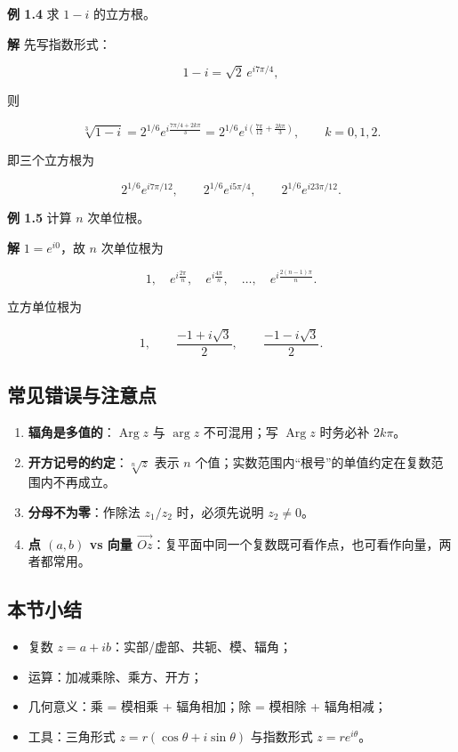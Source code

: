 \textbf{例 1.4} 求 \(1-i\) 的立方根。

\textbf{解} 先写指数形式：

\[
1-i = \sqrt2\,e^{i7\pi/4},
\]

则

\[
\sqrt[3]{1-i}
= 2^{1/6}e^{i\frac{7\pi/4+2k\pi}{3}}
= 2^{1/6}e^{i\left(\frac{7\pi}{12}+\frac{2k\pi}{3}\right)},
\qquad k=0,1,2 .
\]

即三个立方根为

\[
2^{1/6}e^{i7\pi/12},\qquad
2^{1/6}e^{i5\pi/4},\qquad
2^{1/6}e^{i23\pi/12}.
\]

\textbf{例 1.5} 计算 \(n\) 次单位根。

\textbf{解} \(1=e^{i0}\)，故 \(n\) 次单位根为

\[
1,\quad e^{i\frac{2\pi}{n}},\quad e^{i\frac{4\pi}{n}},\quad \ldots,\quad
e^{i\frac{2(n-1)\pi}{n}} .
\]

立方单位根为

\[
1,\qquad \frac{-1+i\sqrt3}{2},\qquad \frac{-1-i\sqrt3}{2}.
\]

\subsection{常见错误与注意点}\label{ux5e38ux89c1ux9519ux8befux4e0eux6ce8ux610fux70b9}

\begin{enumerate}
\def\labelenumi{\arabic{enumi}.}
\tightlist
\item
  \textbf{辐角是多值的}：\(\operatorname{Arg}z\) 与 \(\arg z\)
  不可混用；写 \(\operatorname{Arg}z\) 时务必补 \(2k\pi\)。
\item
  \textbf{开方记号的约定}：\(\sqrt[n]{z}\) 表示 \(n\)
  个值；实数范围内``根号''的单值约定在复数范围内不再成立。
\item
  \textbf{分母不为零}：作除法 \(z_1/z_2\) 时，必须先说明 \(z_2\neq 0\)。
\item
  \textbf{点 \((a,b)\) vs 向量
  \(\overrightarrow{Oz}\)}：复平面中同一个复数既可看作点，也可看作向量，两者都常用。
\end{enumerate}

\subsection{本节小结}\label{ux672cux8282ux5c0fux7ed3}

\begin{itemize}
\tightlist
\item
  复数 \(z=a+ib\)：实部/虚部、共轭、模、辐角；
\item
  运算：加减乘除、乘方、开方；
\item
  几何意义：乘 = 模相乘 + 辐角相加；除 = 模相除 + 辐角相减；
\item
  工具：三角形式 \(z=r(\cos\theta+i\sin\theta)\) 与指数形式
  \(z=re^{i\theta}\)。
\end{itemize}

